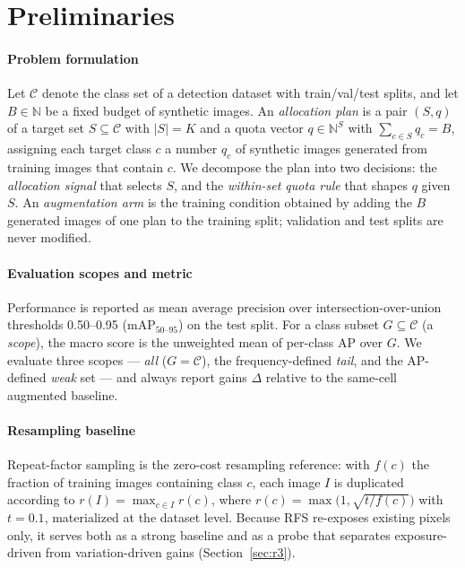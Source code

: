 \documentclass[preprint,12pt,authoryear]{elsarticle}
\newcommand{\mapm}{mAP\(_{50\text{--}95}\)}
\begin{document}
\section{Preliminaries}\label{sec:prelim}

\paragraph{Problem formulation}
Let $\mathcal{C}$ denote the class set of a detection dataset with
train/val/test splits, and let $B \in \mathbb{N}$ be a fixed budget of
synthetic images. An \emph{allocation plan} is a pair $(S, q)$ of a
target set $S \subseteq \mathcal{C}$ with $|S| = K$ and a quota vector
$q \in \mathbb{N}^{S}$ with $\sum_{c \in S} q_c = B$, assigning each
target class $c$ a number $q_c$ of synthetic images generated from
training images that contain $c$. We decompose the plan into two
decisions: the \emph{allocation signal} that selects $S$, and the
\emph{within-set quota rule} that shapes $q$ given $S$. An
\emph{augmentation arm} is the training condition obtained by adding the
$B$ generated images of one plan to the training split; validation and
test splits are never modified.

\paragraph{Evaluation scopes and metric}
Performance is reported as mean average precision over
intersection-over-union thresholds 0.50--0.95 (\mapm) on the test
split. For a class subset $G \subseteq \mathcal{C}$ (a \emph{scope}),
the macro score is the unweighted mean of per-class AP over $G$. We
evaluate three scopes --- \emph{all} ($G = \mathcal{C}$), the
frequency-defined \emph{tail}, and the AP-defined \emph{weak} set ---
and always report gains $\Delta$ relative to the same-cell augmented
baseline.

\paragraph{Resampling baseline}
Repeat-factor sampling \citep[RFS;][]{gupta2019lvis} is the zero-cost
resampling reference: with $f(c)$ the fraction of training images
containing class $c$, each image $I$ is duplicated according to
$r(I) = \max_{c \in I} r(c)$, where
$r(c) = \max\!\bigl(1, \sqrt{t/f(c)}\bigr)$ with $t = 0.1$, materialized
at the dataset level. Because RFS re-exposes existing pixels only, it
serves both as a strong baseline and as a probe that separates
exposure-driven from variation-driven gains (Section~\ref{sec:r3}).
\end{document}
